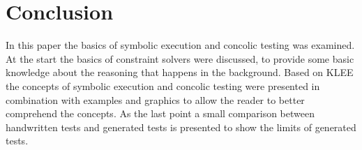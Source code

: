 \section{Conclusion}
In this paper the basics of symbolic execution and concolic testing was examined. At the start the basics of constraint solvers were discussed, to provide some basic knowledge about the reasoning that happens in the background. 
Based on KLEE the concepts of symbolic execution and concolic testing were presented in combination with examples and graphics to allow the reader to better comprehend the concepts.
As the last point a small comparison between handwritten tests and generated tests is presented to show the limits of generated tests.